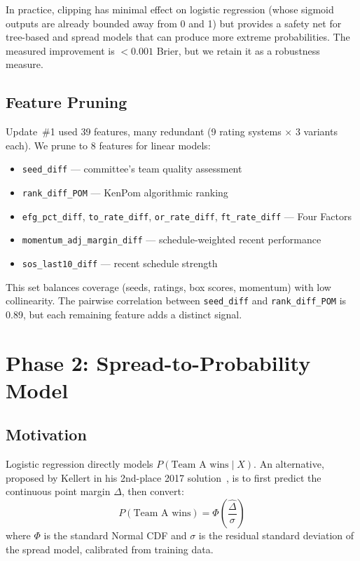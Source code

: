 \documentclass[11pt,a4paper]{article}
\begin{document}
In practice, clipping has minimal effect on logistic regression (whose sigmoid outputs are already bounded away from 0 and 1) but provides a safety net for tree-based and spread models that can produce more extreme probabilities. The measured improvement is $< 0.001$ Brier, but we retain it as a robustness measure.


\subsection{Feature Pruning}

Update~\#1 used 39 features, many redundant (9 rating systems $\times$ 3 variants each). We prune to 8 features for linear models:

\begin{itemize}[nosep]
    \item \texttt{seed\_diff} --- committee's team quality assessment
    \item \texttt{rank\_diff\_POM} --- KenPom algorithmic ranking
    \item \texttt{efg\_pct\_diff}, \texttt{to\_rate\_diff}, \texttt{or\_rate\_diff}, \texttt{ft\_rate\_diff} --- Four Factors
    \item \texttt{momentum\_adj\_margin\_diff} --- schedule-weighted recent performance
    \item \texttt{sos\_last10\_diff} --- recent schedule strength
\end{itemize}

This set balances coverage (seeds, ratings, box scores, momentum) with low collinearity. The pairwise correlation between \texttt{seed\_diff} and \texttt{rank\_diff\_POM} is 0.89, but each remaining feature adds a distinct signal.


\section{Phase 2: Spread-to-Probability Model}

\subsection{Motivation}

Logistic regression directly models $P(\text{Team A wins} \mid X)$. An alternative, proposed by Kellert in his 2nd-place 2017 solution~\citep{kellert2017}, is to first predict the continuous point margin $\Delta$, then convert:
\begin{equation}
    P(\text{Team A wins}) = \Phi\!\left(\frac{\hat{\Delta}}{\sigma}\right)
    \label{eq:spread}
\end{equation}
where $\Phi$ is the standard Normal CDF and $\sigma$ is the residual standard deviation of the spread model, calibrated from training data.
\end{document}
